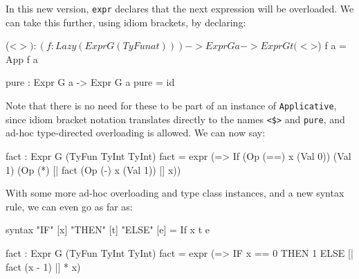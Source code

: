 \noindent
In this new version, \texttt{expr} declares that the next expression will be overloaded.
We can take this further, using idiom brackets, by declaring:

\begin{code}
(<$>) : (f : Lazy (Expr G (TyFun a t))) -> Expr G a -> Expr G t
(<$>) f a = App f a

pure : Expr G a -> Expr G a
pure = id
\end{code} 

\noindent
Note that there is no need for these to be part of an instance of \texttt{Applicative}, since idiom bracket notation translates directly to the names \texttt{<\$>} and \texttt{pure}, and ad-hoc type-directed overloading is allowed.
We can now say:

\begin{code}
fact : Expr G (TyFun TyInt TyInt)
fact = expr (\x => If (Op (==) x (Val 0))
                      (Val 1) (Op (*) [| fact (Op (-) x (Val 1)) |] x))
\end{code} 

\noindent
With some more ad-hoc overloading and type class instances, and a new syntax rule, we can even go as far as:

\begin{code}
syntax "IF" [x] "THEN" [t] "ELSE" [e] = If x t e

fact : Expr G (TyFun TyInt TyInt)
fact = expr (\x => IF x == 0 THEN 1 ELSE [| fact (x - 1) |] * x)
\end{code} 

